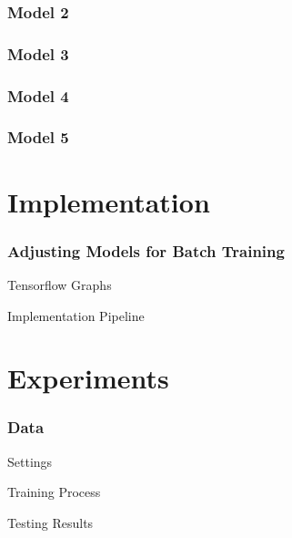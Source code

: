 \documentclass{beamer}
\begin{document}
\begin{frame} \frametitle{Model 2}

\end{frame}

\begin{frame} \frametitle{Model 3}

\end{frame}

\begin{frame} \frametitle{Model 4}

\end{frame}

\begin{frame} \frametitle{Model 5}

\end{frame}

\section{Implementation}

\begin{frame} \frametitle{Adjusting Models for Batch Training}

\end{frame}


\begin{frame}{Tensorflow Graphs}

\end{frame}

\begin{frame}{Implementation Pipeline}

\end{frame}

\section{Experiments}

\begin{frame} \frametitle{Data}

\end{frame}

\begin{frame}{Settings}

\end{frame}

\begin{frame}{Training Process}

\end{frame}

\begin{frame}{Testing Results}

\end{frame}
\end{document}
